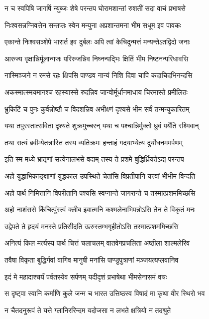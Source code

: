 \twolineshloka
{न च स्वपिषि जागर्षि न्युब्जः शेषे परन्तप}
{घोरामशान्तां रुशतीं सदा वाचं प्रभाषसे}


\twolineshloka
{निःश्वसन्नग्निवत्तेन सन्तप्तः स्वेन मन्युना}
{अप्रशान्तमना भीम सधूम इव पावकः}


\twolineshloka
{एकान्ते निःश्वसञ्शेपे भारार्त इव दुर्बलः}
{अपि त्वां केचिदुन्मत्तं मन्यन्तेऽतद्विदो जनाः}


\twolineshloka
{आरुज्य वृक्षान्निर्मूलान्गजः परिरुजन्निव}
{निघ्नन्पद्भिः क्षितिं भीम निष्टनन्परिधावसि}


\twolineshloka
{नास्मिञ्जने न रमसे रहः क्षिपसि पाण्डव}
{नान्यं निशि दिवा चापि कदाचिदभिनन्दसि}


\twolineshloka
{अकस्मात्स्मयमानश्च रहस्यास्से रुदन्निव}
{जान्वोर्मूर्धानमाधाय चिरमास्ते प्रमीलितः}


\twolineshloka
{भ्रुकिटिं च पुनः कुर्वन्नोष्ठौ च विदशन्निव}
{अभीक्ष्णं दृश्यसे भीम सर्वं तन्मन्युकारितम्}


\twolineshloka
{यथा तपुरस्तात्सविता दृश्यते शुक्रमुच्चरन्}
{यथा च पश्चान्निर्मुक्तो ध्रुवं पर्येति रश्मिवान्}


\twolineshloka
{तथा सत्यं ब्रवीम्येतन्नास्ति तस्य व्यतिक्रमः}
{हन्ताहं गदयाभ्येत्य दुर्योधनममर्पणम्}


\twolineshloka
{इति स्म मध्ये भ्रातृणां सत्येनालभसे वदाम्}
{तस्य ते प्रशमे बुद्धिर्ध्रियतेऽद्य परन्तप}


\twolineshloka
{अहो युद्धाभिकाङ्क्षाणां युद्धकाल उपस्थिते}
{चेतांसि विप्रतीपानि यत्त्वां भीभीम विन्दति}


\twolineshloka
{अहो पार्थ निमित्तानि विपरीतानि पश्यसि}
{स्वप्नान्ते जागरान्ते च तस्मात्प्रशममिच्छसि}


\twolineshloka
{अहो नाशंससे किंचित्पुंस्त्वं क्लीब इवात्मनि}
{कश्मलेनाभिपन्नोऽसि तेन ते विकृतं मनः}


\twolineshloka
{उद्वेपते ते हृदयं मनस्ते प्रतिसीदति}
{ऊरुस्तम्भगृहीतोऽसि तस्मात्प्रशममिच्छसि}


\twolineshloka
{अनित्यं किल मर्त्यस्य पार्थ चित्तं चलाचलम्}
{वातवेगप्रचलिता अष्ठीला शाल्मलेरिव}


\twolineshloka
{तवैषा विकृता बुद्धिर्गवां वागिव मानुषी}
{मनांसि पाण्डुपुत्राणां मञ्जयत्यप्लवानिव}


\twolineshloka
{इदं मे महादाश्चर्यं पर्वतस्येव सर्पणम्}
{यदीदृशं प्रभाषेथा भीमसेनासमं वचः}


\twolineshloka
{स दृष्ट्वा स्वानि कर्माणि कुले जन्म च भारत}
{उत्तिष्ठस्व विषादं मा कृथा वीर स्थिरो भव}


\twolineshloka
{न चैतदनुरूपं ते यत्ते ग्लानिररिन्दम}
{यदोजसा न लभते क्षत्रियो न तदश्रुते}


